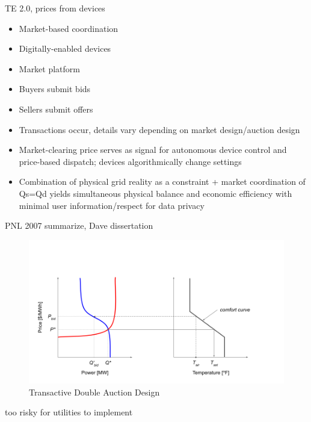 TE 2.0, prices from devices
\begin{itemize}
    \item Market-based coordination
    \item Digitally-enabled devices
    \item Market platform
    \item Buyers submit bids
    \item Sellers submit offers
    \item Transactions occur, details vary depending on market design/auction design
    \item Market-clearing price serves as signal for autonomous device control and price-based dispatch; devices algorithmically change settings
    \item Combination of physical grid reality as a constraint + market coordination of Qs=Qd yields simultaneous physical balance and economic efficiency with minimal user information/respect for data privacy
\end{itemize}

PNL 2007 summarize, Dave dissertation

\begin{figure}[h]
\centering
\includegraphics[scale=0.4]{images/TE_DA.png}
\caption{Transactive Double Auction Design}
\label{fig:Transactive_DA}
\end{figure}


too risky for utilities to implement

